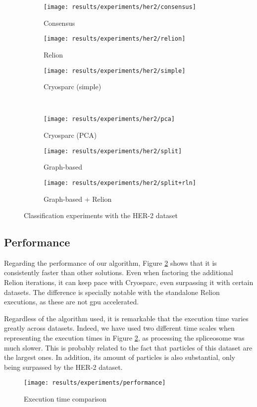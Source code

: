 \documentclass[../main.tex]{subfiles}
\begin{document}
\begin{figure}[hbp]
    \centering
    \begin{subfigure}[b]{0.3\textwidth}
         \centering
         \texttt{[image: results/experiments/her2/consensus]}
         \caption{Consensus}
    \end{subfigure}
    \begin{subfigure}[b]{0.3\textwidth}
         \centering
         \texttt{[image: results/experiments/her2/relion]}
         \caption{Relion}
    \end{subfigure}
    \begin{subfigure}[b]{0.3\textwidth}
         \centering
         \texttt{[image: results/experiments/her2/simple]}
         \caption{Cryosparc (simple)}
    \end{subfigure}\\
    \vspace{1em}
    \begin{subfigure}[b]{0.3\textwidth}
         \centering
         \texttt{[image: results/experiments/her2/pca]}
         \caption{Cryosparc (PCA)}
    \end{subfigure}
    \begin{subfigure}[b]{0.3\textwidth}
         \centering
         \texttt{[image: results/experiments/her2/split]}
         \caption{Graph-based}
    \end{subfigure}
    \begin{subfigure}[b]{0.3\textwidth}
         \centering
         \texttt{[image: results/experiments/her2/split+rln]}
         \caption{Graph-based + Relion}
    \end{subfigure}
    \caption{Classification experiments with the HER-2 dataset}
    \label{fig:5.2:her2_slices}
\end{figure}

\subsection{Performance}
Regarding the performance of our algorithm, Figure \ref{fig:5.2:performance} shows that it is consistently faster than other solutions. Even when factoring the additional Relion iterations, it can keep pace with Cryosparc, even surpassing it with certain datasets. The difference is specially notable with the standalone Relion executions, as these are not \gls{gpu} accelerated.

Regardless of the algorithm used, it is remarkable that the execution time varies greatly across datasets. Indeed, we have used two different time scales when representing the execution times in Figure \ref{fig:5.2:performance}, as processing the spliceosome was much slower. This is probably related to the fact that particles of this dataset are the largest ones. In addition, its amount of particles is also substantial, only being surpassed by the HER-2 dataset.

\begin{figure}
    \centering
    \texttt{[image: results/experiments/performance]}
    \caption{Execution time comparison}
    \label{fig:5.2:performance}
\end{figure}
\end{document}
